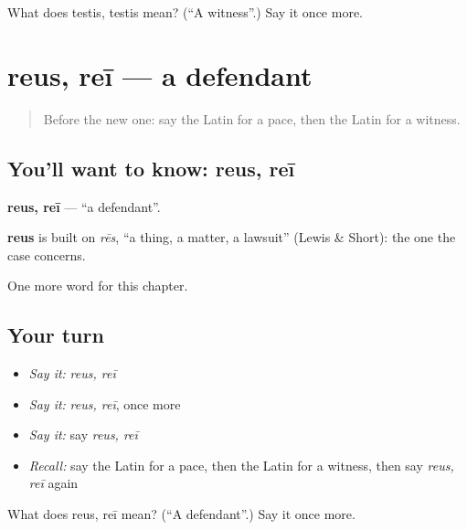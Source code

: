 \begin{tcolorbox}[breakable,colback=teal!4,colframe=teal!35!black,title={Before you move on}]
What does testis, testis mean? (\textquotedblleft{}A witness\textquotedblright{}.) Say it once more.
\end{tcolorbox}
\section[reus, reī]{reus, reī — a defendant}

\label{lesson:LA-C218-reus}



\begin{quote}
Before the new one: say the Latin for a pace, then the Latin for a witness.
\end{quote}

\subsection*{You'll want to know: reus, reī}
\textbf{reus, reī} — \textquotedblleft{}a defendant\textquotedblright{}.

\begin{cousinweb}
\textbf{reus} is built on \emph{rēs}, \textquotedblleft{}a thing, a matter, a lawsuit\textquotedblright{} (Lewis \& Short): the one the case concerns.
\end{cousinweb}

\begin{grammarlens}[title={What you've built}]
One more word for this chapter.
\end{grammarlens}

\subsection*{Your turn}
\begin{itemize}
\raggedright
  \item \emph{Say it:} \emph{reus, reī}
  \item \emph{Say it:} \emph{reus, reī}, once more
  \item \emph{Say it:} say \emph{reus, reī}
  \item \emph{Recall:} say the Latin for a pace, then the Latin for a witness, then say \emph{reus, reī} again
\end{itemize}

\begin{tcolorbox}[breakable,colback=teal!4,colframe=teal!35!black,title={Before you move on}]
What does reus, reī mean? (\textquotedblleft{}A defendant\textquotedblright{}.) Say it once more.
\end{tcolorbox}
